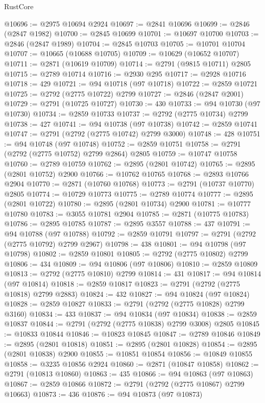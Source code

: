 \begin{lexlean}{RustCore}
\begin{coremodule}
@10696 := @2975 @10694 @2924
@10697 := @2841 @10696
@10699 := @2846 (@2847 @1982)
@10700 := @2845 @10699
@10701 := @10697 @10700
@10703 := @2846 (@2847 @1989)
@10704 := @2845 @10703
@10705 := @10701 @10704
@10707 := @10665 (@10688 @10705)
@10709 := @10629 (@10652 @10707)
@10711 := @2871 (@10619 @10709)
@10714 := @2791 (@9815 @10711) @2805
@10715 := @2789 @10714
@10716 := @2930 @295
@10717 := @2928 @10716
@10718 := 429
@10721 := @94 @10718 (@97 @10718)
@10722 := @2859 @10721
@10725 := @2792 (@2775 @10722) @2799
@10727 := @2846 (@2847 @2001)
@10729 := @2791 (@10725 @10727)
@10730 := 430
@10733 := @94 @10730 (@97 @10730)
@10734 := @2859 @10733
@10737 := @2792 (@2775 @10734) @2799
@10738 := 427
@10741 := @94 @10738 (@97 @10738)
@10742 := @2859 @10741
@10747 := @2791 (@2792 (@2775 @10742) @2799 @3000)
@10748 := 428
@10751 := @94 @10748 (@97 @10748)
@10752 := @2859 @10751
@10758 := @2791 (@2792 (@2775 @10752) @2799 @2864) @2805
@10759 := @10747 @10758
@10760 := @2789 @10759
@10762 := @2895 (@2801 @10742)
@10765 := @2895 (@2801 @10752) @2900
@10766 := @10762 @10765
@10768 := @2893 @10766 @2904
@10770 := @2871 (@10760 @10768)
@10773 := @2791 (@10737 @10770) @2805
@10774 := @10729 @10773
@10775 := @2789 @10774
@10777 := @2895 (@2801 @10722)
@10780 := @2895 (@2801 @10734) @2900
@10781 := @10777 @10780
@10783 := @3055 @10781 @2904
@10785 := @2871 (@10775 @10783)
@10786 := @2895 @10785
@10787 := @2895 @3557
@10788 := 437
@10791 := @94 @10788 (@97 @10788)
@10792 := @2859 @10791
@10797 := @2791 (@2792 (@2775 @10792) @2799 @2967)
@10798 := 438
@10801 := @94 @10798 (@97 @10798)
@10802 := @2859 @10801
@10805 := @2792 (@2775 @10802) @2799
@10806 := 434
@10809 := @94 @10806 (@97 @10806)
@10810 := @2859 @10809
@10813 := @2792 (@2775 @10810) @2799
@10814 := 431
@10817 := @94 @10814 (@97 @10814)
@10818 := @2859 @10817
@10823 := @2791 (@2792 (@2775 @10818) @2799 @2883)
@10824 := 432
@10827 := @94 @10824 (@97 @10824)
@10828 := @2859 @10827
@10833 := @2791 (@2792 (@2775 @10828) @2799 @3160)
@10834 := 433
@10837 := @94 @10834 (@97 @10834)
@10838 := @2859 @10837
@10844 := @2791 (@2792 (@2775 @10838) @2799 @3008) @2805
@10845 := @10833 @10844
@10846 := @10823 @10845
@10847 := @2789 @10846
@10849 := @2895 (@2801 @10818)
@10851 := @2895 (@2801 @10828)
@10854 := @2895 (@2801 @10838) @2900
@10855 := @10851 @10854
@10856 := @10849 @10855
@10858 := @3235 @10856 @2924
@10860 := @2871 (@10847 @10858)
@10862 := @2791 (@10813 @10860)
@10863 := 435
@10866 := @94 @10863 (@97 @10863)
@10867 := @2859 @10866
@10872 := @2791 (@2792 (@2775 @10867) @2799 @10663)
@10873 := 436
@10876 := @94 @10873 (@97 @10873)

\end{coremodule}
\end{lexlean}
